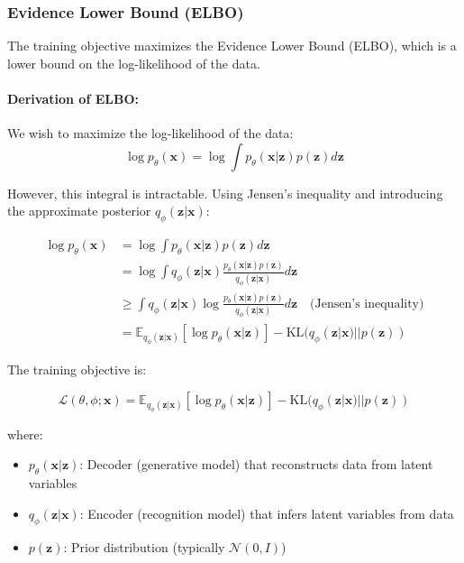 \documentclass[conference]{IEEEtran}
\begin{document}
\subsubsection{Evidence Lower Bound (ELBO)}

The training objective maximizes the Evidence Lower Bound (ELBO), which is a lower bound on the log-likelihood of the data.

\paragraph{Derivation of ELBO:}
We wish to maximize the log-likelihood of the data:
\begin{equation}
\log p_\theta(\mathbf{x}) = \log \int p_\theta(\mathbf{x}|\mathbf{z})p(\mathbf{z}) d\mathbf{z}
\end{equation}

However, this integral is intractable. Using Jensen's inequality and introducing the approximate posterior $q_\phi(\mathbf{z}|\mathbf{x})$:

\begin{align}
\log p_\theta(\mathbf{x}) &= \log \int p_\theta(\mathbf{x}|\mathbf{z})p(\mathbf{z}) d\mathbf{z} \\
&= \log \int q_\phi(\mathbf{z}|\mathbf{x}) \frac{p_\theta(\mathbf{x}|\mathbf{z})p(\mathbf{z})}{q_\phi(\mathbf{z}|\mathbf{x})} d\mathbf{z} \\
&\geq \int q_\phi(\mathbf{z}|\mathbf{x}) \log \frac{p_\theta(\mathbf{x}|\mathbf{z})p(\mathbf{z})}{q_\phi(\mathbf{z}|\mathbf{x})} d\mathbf{z} \quad \text{(Jensen's inequality)} \\
&= \mathbb{E}_{q_\phi(\mathbf{z}|\mathbf{x})}[\log p_\theta(\mathbf{x}|\mathbf{z})] - \text{KL}(q_\phi(\mathbf{z}|\mathbf{x}) || p(\mathbf{z}))
\end{align}

The training objective is:

\begin{equation}
\mathcal{L}(\theta, \phi; \mathbf{x}) = \mathbb{E}_{q_\phi(\mathbf{z}|\mathbf{x})} [\log p_\theta(\mathbf{x}|\mathbf{z})] - \text{KL}(q_\phi(\mathbf{z}|\mathbf{x}) || p(\mathbf{z}))
\end{equation}

where:
\begin{itemize}
    \item $p_\theta(\mathbf{x}|\mathbf{z})$: Decoder (generative model) that reconstructs data from latent variables
    \item $q_\phi(\mathbf{z}|\mathbf{x})$: Encoder (recognition model) that infers latent variables from data
    \item $p(\mathbf{z})$: Prior distribution (typically $\mathcal{N}(0, I)$)
\end{itemize}
\end{document}
